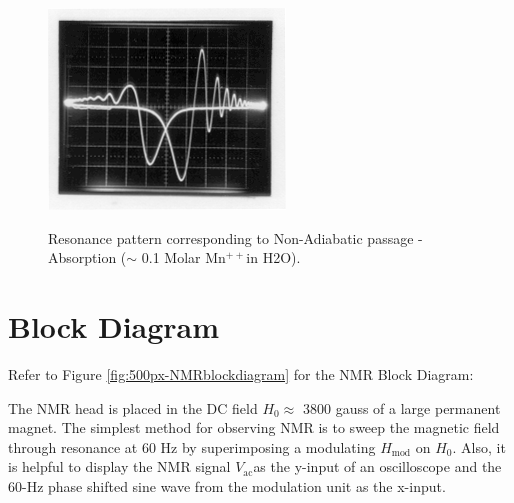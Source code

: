 \documentclass{../lab}
\begin{document}
\begin{figure}[h]
\begin{minipage}[t]{0.31\textwidth}
    \label{fig:AdiabaticDispersion}
\end{minipage}\hfill
\begin{minipage}[t]{0.31\textwidth}
    \href{http://experimentationlab.berkeley.edu/sites/default/files/images/NMR19.gif}{\includegraphics[width=\linewidth]{images/NMR19.png}}
    \caption{Resonance pattern corresponding to Non-Adiabatic passage - Absorption ($\sim$ 0.1 Molar Mn$^{++}$in H2O).}
    \label{fig:NonAdiabaticAbsorption}
\end{minipage}
\end{figure}



\newpage

\section{Block Diagram}

Refer to Figure \ref{fig:500px-NMRblockdiagram} for the NMR Block Diagram:

The NMR head is placed in the DC field $H_0 \approx$ 3800 gauss of a large permanent magnet. The simplest method for observing NMR is to sweep the magnetic field through resonance at 60 Hz by superimposing a modulating $H_\text{mod}$ on $H_0$. Also, it is helpful to display the NMR signal $V_\text{ac}$as the y-input of an oscilloscope and the 60-Hz phase shifted sine wave from the modulation unit as the x-input.
\end{document}
